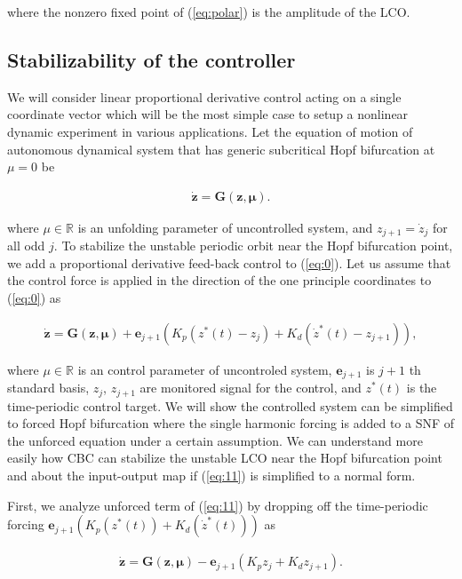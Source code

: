 \documentclass[openacc]{rsproca_new}%
\def\real{\mathbb{R}}
\def\vec#1{\ensuremath{\mathbf{#1}}}
\newcommand{\Eref}[1]{(\ref{#1})}
\begin{document}
\noindent where the nonzero fixed point of \Eref{eq:polar} is the amplitude of the LCO.

\subsection{Stabilizability of the controller}

We will consider linear proportional derivative control acting on a single coordinate vector which will be the most simple case to setup a nonlinear dynamic experiment in various applications. Let the equation of motion of autonomous dynamical system that has  generic subcritical Hopf bifurcation at $\mu=0$ be

\begin{align}\label{eq:0}
    \dot{\vec{z}} =\vec{G}(\vec{z},\vec{\mu}).
\end{align}

\noindent where $\mu\in \real$ is an unfolding parameter of uncontrolled system, and $z_{j+1}=\dot z_j$ for all odd $j$. To stabilize the unstable periodic orbit near the Hopf bifurcation point, we add a proportional derivative feed-back control to \Eref{eq:0}. Let us assume that the control force is applied in the direction of the one principle coordinates to \Eref{eq:0} as

\begin{align}\label{eq:11}
    \dot{\vec{z}} =\vec{G}(\vec{z},\vec{\mu})+\vec{e}_{j+1}(K_p(z^*(t)-z_j)+K_d(\dot z^*(t)-z_{j+1})),
\end{align}

\noindent where $\mu\in \real$ is an control parameter of uncontroled system, $\vec{e}_{j+1}$ is $j+1$ th standard basis, $z_{j}$, $z_{j+1}$ are monitored signal for the control, and $z^*(t)$  is the time-periodic control target. We will show the controlled system can be simplified to forced Hopf bifurcation where the single harmonic forcing is added to a SNF of the unforced equation under a certain assumption. We can understand more easily how CBC can stabilize the unstable LCO near the Hopf bifurcation point and about the input-output map if \Eref{eq:11} is simplified to a normal form.

First, we analyze unforced term of \Eref{eq:11} by dropping off the time-periodic forcing $\vec{e}_{j+1}(K_p(z^*(t))+K_d(\dot z^*(t)))$ as

\begin{align}\label{eq:12}
    \dot{\vec{z}} =\vec{G}(\vec{z},\vec{\mu})-\vec{e}_{j+1}(K_p z_j+K_d z_{j+1}).
\end{align}
\end{document}

